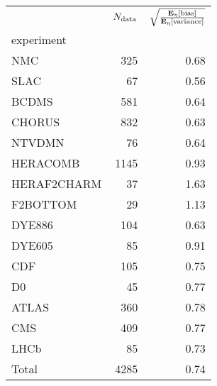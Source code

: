 \begin{center}
    \begin{tabular}{lrr}
        \toprule
        {} &  $N_{\rm data}$ &  $\sqrt{\frac{\mathbf{E}_{\eta}\left[ {\rm bias} \right]}{\mathbf{E}_{\eta}\left[ {\rm variance} \right]}}$ \\
        experiment  &        &                      \\
        \midrule
        NMC         &    325 &                 0.68 \\
        SLAC        &     67 &                 0.56 \\
        BCDMS       &    581 &                 0.64 \\
        CHORUS      &    832 &                 0.63 \\
        NTVDMN      &     76 &                 0.64 \\
        HERACOMB    &   1145 &                 0.93 \\
        HERAF2CHARM &     37 &                 1.63 \\
        F2BOTTOM    &     29 &                 1.13 \\
        DYE886      &    104 &                 0.63 \\
        DYE605      &     85 &                 0.91 \\
        CDF         &    105 &                 0.75 \\
        D0          &     45 &                 0.77 \\
        ATLAS       &    360 &                 0.78 \\
        CMS         &    409 &                 0.77 \\
        LHCb        &     85 &                 0.73 \\
        Total       &   4285 &                 0.74 \\
        \bottomrule
    \end{tabular}
\end{center}

